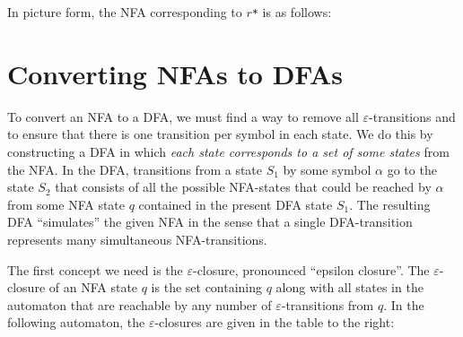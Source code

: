 \documentclass[a4paper]{article}
\newcommand\eps{\ensuremath{\varepsilon}}
\newcommand{\regex}[1]{\texttt{#1}}
\begin{document}
\needspace{10cm}
In picture form, the NFA corresponding to \regex{$r$*} is as follows:

\begin{center}
\end{center}


\section*{Converting NFAs to DFAs}

To convert an NFA to a DFA, we must find a way to remove all
\eps-transitions and to ensure that there is one transition per symbol
in each state. We do this by constructing a DFA in which \emph{each
  state corresponds to a set of some states} from the NFA\@.  In the
DFA, transitions from a state $S_1$ by some symbol $\alpha$ go to the
state $S_2$ that consists of all the possible NFA-states that could be
reached by $\alpha$ from some NFA state $q$ contained in the present
DFA state $S_1$.  The resulting DFA ``simulates'' the given NFA in the
sense that a single DFA-transition represents many simultaneous
NFA-transitions.

The first concept we need is the \eps-closure, pronounced ``epsilon
closure''.  The \eps-closure of an NFA state $q$ is the set containing
$q$ along with all states in the automaton that are reachable by any
number of \eps-transitions from $q$. In the following automaton, the
\eps-closures are given in the table to the right:
\end{document}
